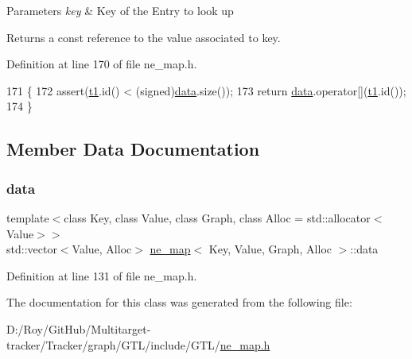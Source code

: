 \begin{DoxyParams}{Parameters}
{\em key} & Key of the Entry to look up \\
\hline
\end{DoxyParams}
\begin{DoxyReturn}{Returns}
a const reference to the value associated to {\ttfamily key}. 
\end{DoxyReturn}


Definition at line 170 of file ne\+\_\+map.\+h.


\begin{DoxyCode}
171 \{
172     assert(\mbox{\hyperlink{gml2nestedsql_8cpp_a214bd1a0500f5739ce581a8bcffb518a}{t1}}.id() < (signed)\mbox{\hyperlink{classne__map_af73307678e05a9c24c084d98b267afa8}{data}}.size());
173     \textcolor{keywordflow}{return} \mbox{\hyperlink{classne__map_af73307678e05a9c24c084d98b267afa8}{data}}.operator[](\mbox{\hyperlink{gml2nestedsql_8cpp_a214bd1a0500f5739ce581a8bcffb518a}{t1}}.id());
174 \}
\end{DoxyCode}


\subsection{Member Data Documentation}
\mbox{\label{classne__map_af73307678e05a9c24c084d98b267afa8}} 
\subsubsection{\texorpdfstring{data}{data}}
{\footnotesize\ttfamily template$<$class Key, class Value, class Graph, class Alloc = std\+::allocator$<$\+Value$>$$>$ \\
std\+::vector$<$Value, Alloc$>$ \mbox{\hyperlink{classne__map}{ne\+\_\+map}}$<$ Key, Value, Graph, Alloc $>$\+::data\hspace{0.3cm}{\ttfamily [private]}}



Definition at line 131 of file ne\+\_\+map.\+h.



The documentation for this class was generated from the following file\+:\begin{DoxyCompactItemize}
\item 
D\+:/\+Roy/\+Git\+Hub/\+Multitarget-\/tracker/\+Tracker/graph/\+G\+T\+L/include/\+G\+T\+L/\mbox{\hyperlink{ne__map_8h}{ne\+\_\+map.\+h}}\end{DoxyCompactItemize}
